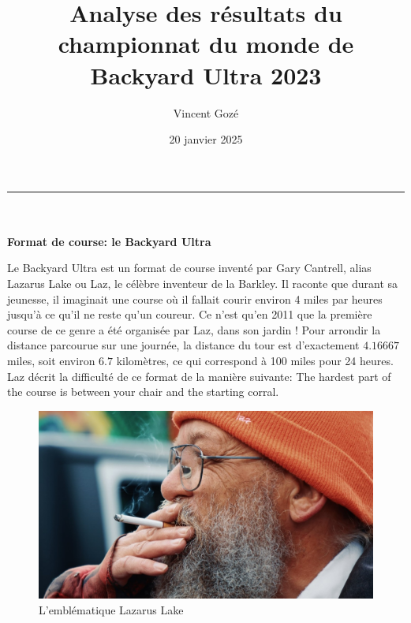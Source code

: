 \documentclass[a4paper,12pt]{article}
\begin{document}
		\title{Analyse des résultats du championnat du monde de \\  Backyard Ultra 2023}
		\author{Vincent Gozé}
		\date{20 janvier 2025}
		\maketitle
\begin{center}
	\noindent\rule{13cm}{0.3pt}\\ ~ \\
	\textbf{Format de course: le Backyard Ultra}
\end{center}


Le Backyard Ultra est un format de course inventé par Gary Cantrell, alias Lazarus Lake ou Laz, le célèbre inventeur de la Barkley. Il raconte que durant sa jeunesse, il imaginait une course où il fallait courir environ 4 miles par heures jusqu'à ce qu'il ne reste qu'un coureur. Ce n'est qu'en 2011 que la première course de ce genre a été organisée par Laz, dans son jardin ! Pour arrondir la distance parcourue sur une journée, la distance du tour est d'exactement $4.16667$ miles, soit environ $6.7$ kilomètres, ce qui correspond à 100 miles pour 24 heures.  Laz décrit la difficulté de ce format de la manière suivante: \og	The hardest part of the course is between your chair and the starting corral.\fg{}

\medskip

\begin{figure}[b]
	
	\includegraphics[scale=0.15]{Laz}
	\centering
	\caption{L'emblématique Lazarus Lake}
\end{figure}
\end{document}
